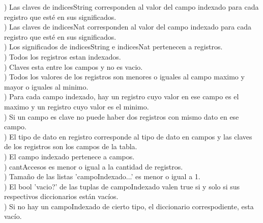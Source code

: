 \begin{Representacion}
  \noindent{}) Las claves de indicesString corresponden al valor del campo indexado para cada registro que esté en sus significados. \\
  \noindent{}) Las claves de indicesNat corresponden al valor del campo indexado para cada registro que esté en sus significados. \\
  \noindent{}) Los significados de indicesString e indicesNat pertenecen a registros. \\
  \noindent{}) Todos los registros estan indexados. \\
  \noindent{}) Claves esta entre los campos y no es vacio. \\
  \noindent{}) Todos los valores de los registros son menores o iguales al campo maximo y mayor o iguales al minimo. \\
  \noindent{}) Para cada campo indexado, hay un registro cuyo valor en ese campo es el maximo y un registro cuyo valor es el minimo. \\
  \noindent{}) Si un campo es clave no puede haber dos registros con mismo dato en ese campo. \\
  \noindent{}) El tipo de dato en registro corresponde al tipo de dato en campos y las claves de los registros son los campos de la tabla. \\
  \noindent{}) El campo indexado pertenece a campos. \\
  \noindent{}) cantAccesos es menor o igual a la cantidad de registros. \\
  \noindent{}) Tamaño de las listas 'campoIndexado...' es menor o igual a 1. \\
  \noindent{}) El bool 'vacio?' de las tuplas de campoIndexado valen true si y solo si sus respectivos diccionarios están vacíos. \\
  \noindent{}) Si no hay un campoIndexado de cierto tipo, el diccionario correspodiente, esta vacío.\\


\end{Representacion}
